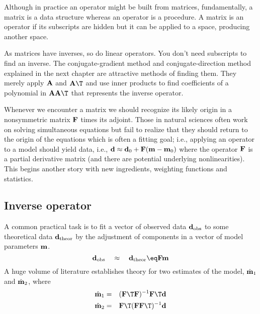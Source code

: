 \par
Although in practice an operator might be built from matrices,
fundamentally,
a matrix is a data structure whereas
an operator is a procedure.
A matrix is an operator if its subscripts are hidden
but it can be applied to a space, producing another space.
\par
As matrices have inverses, so do linear operators.
You don't need subscripts to find an inverse.
The
conjugate-gradient method and
conjugate-direction method
explained in the next chapter
are attractive methods of finding them.
They merely apply
$\bold A$
and
$\bold A\T$
and use inner products to find coefficients
of a polynomial in
$\bold A\bold A\T$
that represents the inverse operator.
\par
Whenever we encounter a  matrix we should recognize
its likely origin in a nonsymmetric matrix
$\bold F$
times its adjoint.
Those in
natural sciences often work on solving simultaneous equations but fail
to realize that they should return to the origin of the equations
which is often a fitting goal; i.e.,
applying an operator to a model should yield data,
i.e.,
$\bold d  \approx  \bold d_0 + \bold F(\bold m-\bold m_0)$
where the operator
$\bold F$
is a partial derivative matrix
(and there are potential underlying nonlinearities).
This begins another story with new ingredients,
weighting functions and statistics.

\subsection{Inverse operator}
A common practical task is to fit a vector of observed data
$\bold d_{\rm obs}$
to some theoretical data
$\bold d_{\rm theor}$
by the adjustment of components in a vector of model parameters $\bold m$.
\begin{equation}
\bold d_{\rm obs}
\quad\approx\quad
\bold d_{\rm theor}
\eq
\bold F \bold m
\label{eqn:wefit}
\end{equation}
A huge volume of literature establishes theory for two estimates
of the model,
$\hat {\bold m}_1$ and
$\hat {\bold m}_2$, where
\begin{eqnarray}
\hat {\bold m}_1 &=& (\bold F\T\bold F)^{-1}\bold F\T\bold d
                                                \label{eqn:overdeterm} \\
\hat {\bold m}_2 &=& \bold F\T(\bold F\bold F\T)^{-1}\bold d
                                                \label{eqn:underdeterm}
\end{eqnarray}

